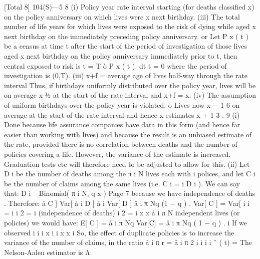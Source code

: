 \documentclass[a4paper,12pt]{article}
\begin{document}
[Total 8]
104(S)—5
8
(i) Policy year rate interval starting (for deaths classified x) on the policy
anniversary on which lives were x next birthday.
(iii) The total number of life years for which lives were exposed to the risk of
dying while aged x next birthday on the immediately preceding policy
anniversary.
or
Let P x ( t ) be a census at time t after the start of the period of investigation of those
lives aged x next birthday on the policy anniversary immediately prior to t, then
central exposed to risk is
t = T
ò P x ( t ). dt
t = 0
where the period of investigation is (0,T).
(iii) x+f = average age of lives half-way through the rate interval
Thus, if birthdays uniformly distributed over the policy year, lives will be
on average x-1⁄2 at the start of the rate interval and x+f = x.
(iv) The assumption of uniform birthdays over the policy year is violated.
o
Lives now x − 1 6 on average at the start of the rate interval and hence \mu x
estimates \mu x + 1 3 .
9
(i) Done because life assurance companies have data in this form (and hence
far easier than working with lives) and because the result is an unbiased
estimate of the rate, provided there is no correlation between deaths and
the number of policies covering a life. However, the variance of the
estimate is increased. Graduation tests etc will therefore need to be
adjusted to allow for this.
(ii) Let D i be the number of deaths among the π i N lives each with i polices,
and let C i be the number of claims among the same lives (i.e. C i = i D i ).
We can say that:
D i
~
Binomial( π i N, q x )
Page 7%
because we have independence of deaths . Therefore:
å C ]
Var[ å i D ]
å i Var[ D ]
å i π Nq (1 − q ) .
Var[ C ] =
Var[
i
i
=
i
i
2
=
i
(independence of deaths)
i
2
=
i
x
x
å i π N independent lives (or policies) we would have:
E[ C ] = å i π Nq
Var[C] = å i π Nq ( 1 − q ) .
i
If we observed
i
i
i
x
i
i
x
x
i
So, the effect of duplicate policies is to increase the variance of the number of
claims, in the ratio
å i π
r =
å i π
2
i
i
i
i
ˆ ( t) =
The Nelson-Aalen estimator is Λ
\end{document}
